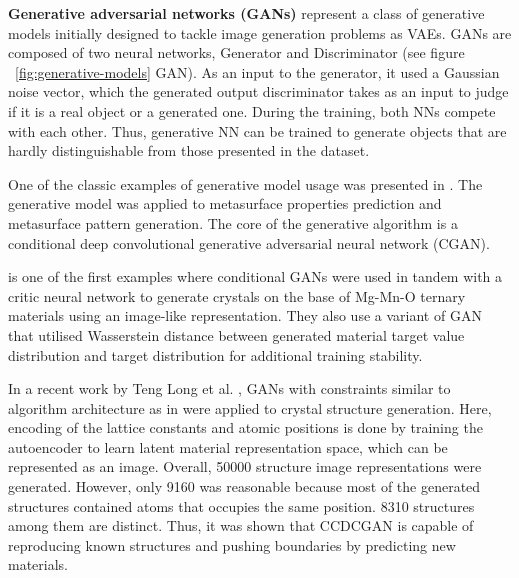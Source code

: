 \textbf{Generative adversarial networks (GANs)} represent a class of generative models initially designed to tackle image generation problems as VAEs. GANs are composed of two neural networks, Generator and Discriminator \cite{goodfellow2020generative} (see figure ~\ref{fig:generative-models} GAN). As an input to the generator, it used a Gaussian noise vector, which the generated output discriminator takes as an input to judge if it is a real object or a generated one. During the training, both NNs compete with each other. Thus, generative NN can be trained to generate objects that are hardly distinguishable from those presented in the dataset.

One of the classic examples of generative model usage was presented in \cite{yeung2021global}. The generative model was applied to metasurface properties prediction and metasurface pattern generation. The core of the generative algorithm is a conditional deep convolutional generative adversarial neural network (CGAN).

\cite{kim2020generative} is one of the first examples where conditional GANs were used in tandem with a critic neural network to generate crystals on the base of Mg-Mn-O ternary materials using an image-like representation. They also use a variant of GAN that utilised Wasserstein distance \cite{arjovsky2017wasserstein} between generated material target value distribution and target distribution for additional training stability.

In a recent work by Teng Long et al.  \cite{long2022inverse}, GANs with constraints similar to algorithm architecture as in \cite{kim2020generative} were applied to crystal structure generation. Here, encoding of the lattice constants and atomic positions is done by training the autoencoder to learn latent material representation space, which can be represented as an image. Overall, 50000 structure image representations were generated. However, only 9160 was reasonable because most of the generated structures contained atoms that occupies the same position. 8310 structures among them are distinct. Thus, it was shown that CCDCGAN is capable of reproducing known structures and pushing boundaries by predicting new materials.

